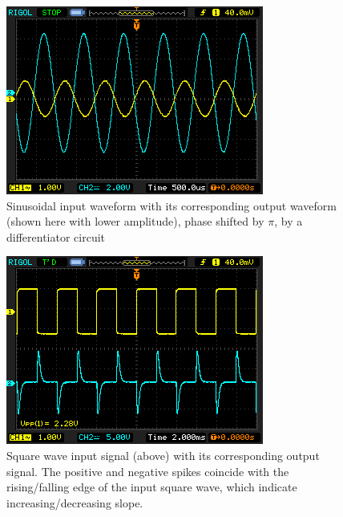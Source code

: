     \begin{figure}[H]
        \centering
        \includegraphics[width=0.75\columnwidth]{images/diff01.png}
        \caption{Sinusoidal input waveform with its corresponding output waveform (shown here with lower amplitude), phase shifted by $\pi$, by a differentiator circuit}
        \label{diff1}
    \end{figure}

    \begin{figure}[H]
        \centering
        \includegraphics[width=0.75\columnwidth]{images/diff3.png}
        \caption{Square wave input signal (above) with its corresponding output signal. The positive and negative spikes coincide with the rising/falling edge of the input square wave, which indicate increasing/decreasing slope.}
        \label{diff2}
    \end{figure}

